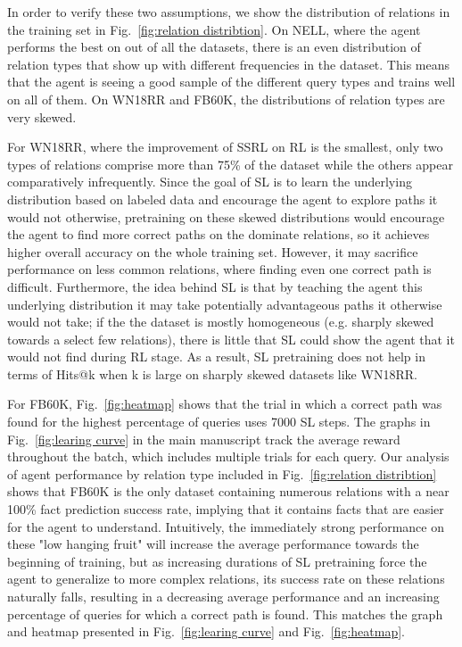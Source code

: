 \documentclass[lettersize,journal]{IEEEtran}
\begin{document}
In order to verify these two assumptions, we show the distribution of relations in the training set in Fig.~\ref{fig:relation distribtion}. On NELL, where the agent performs the best on out of all the datasets, there is an even distribution of relation types that show up with different frequencies in the dataset. This means that the agent is seeing a good sample of the different query types and trains well on all of them. On WN18RR and FB60K, the distributions of relation types are very skewed. 

For WN18RR, where the improvement of SSRL on RL is the smallest, only two types of relations comprise more than 75\% of the dataset while the others appear comparatively infrequently. Since the goal of SL is to learn the underlying distribution based on labeled data and encourage the agent to explore paths it would not otherwise, pretraining on these skewed distributions would encourage the agent to find more correct paths on the dominate relations, so it achieves higher overall accuracy on the whole training set. However, it may sacrifice performance on less common relations, where finding even one correct path is difficult. Furthermore, the idea behind SL is that by teaching the agent this underlying distribution it may take potentially advantageous paths it otherwise would not take; if the the dataset is mostly homogeneous (e.g. sharply skewed towards a select few relations), there is little that SL could show the agent that it would not find during RL stage. As a result, SL pretraining does not help in terms of Hits@k when k is large on sharply skewed datasets like WN18RR. 

For FB60K, Fig.~\ref{fig:heatmap} shows that the trial in which a correct path was found for the highest percentage of queries uses 7000 SL steps. The graphs in Fig.~\ref{fig:learing curve} in the main manuscript track the average reward throughout the batch, which includes multiple trials for each query. Our analysis of agent performance by relation type included in Fig.~\ref{fig:relation distribtion} shows that FB60K is the only dataset containing numerous relations with a near 100\% fact prediction success rate, implying that it contains facts that are easier for the agent to understand. Intuitively, the immediately strong performance on these "low hanging fruit" will increase the average performance towards the beginning of training, but as increasing durations of SL pretraining force the agent to generalize to more complex relations, its success rate on these relations naturally falls, resulting in a decreasing average performance and an increasing percentage of queries for which a correct path is found. This matches the graph and heatmap presented in Fig.~\ref{fig:learing curve} and Fig.~\ref{fig:heatmap}.
\end{document}
